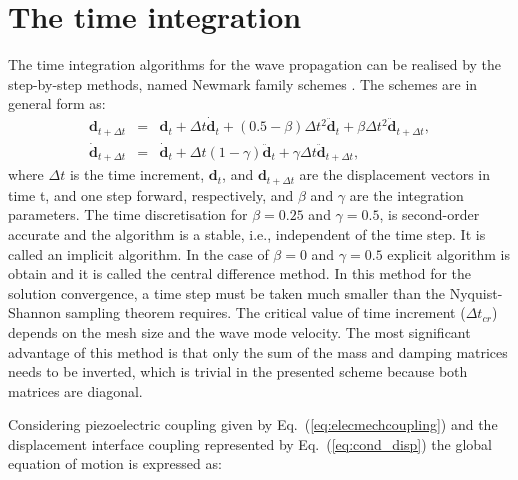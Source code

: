 \section{The time integration}
\label{sec:time}

The time integration algorithms for the wave propagation can be realised by the step-by-step methods, named Newmark family schemes \cite{newmark1959method}.
The schemes are in general form as:
\begin{eqnarray}
	\label{eq:u_newmark}
	\textbf{d}_{t+\Delta t} & = & \textbf{d}_{t} +\Delta t \dot{\textbf{d}}_{t} + \left( 0.5 - \beta \right)\Delta t^2\ddot{\textbf{d}}_{t} + \beta \Delta t^2\ddot{\textbf{d}}_{t+\Delta t},\\
	\dot{\textbf{d}}_{t+\Delta t} & = & \dot{\textbf{d}}_{t} + \Delta t\left(1-\gamma\right)\ddot{\textbf{d}}_{t} + \gamma \Delta t\ddot{\textbf{d}}_{t+\Delta t},
\end{eqnarray}
where \(\Delta t\) is the time increment, \(\textbf{d}_{t}\), and \(\textbf{d}_{t+\Delta t}\) are the displacement vectors in time t, and one step forward, respectively, and \(\beta\) and \(\gamma\) are the integration parameters.
The time discretisation for \(\beta = 0.25\) and \(\gamma = 0.5\), is second-order accurate and the algorithm is a stable, i.e., independent of the time step. It is called an implicit algorithm.
In the case of \(\beta = 0\) and \(\gamma = 0.5\) explicit algorithm is obtain and it is called the central difference method.
In this method for the solution convergence, a time step must be taken much smaller than the Nyquist-Shannon sampling theorem requires.
The critical value of time increment (\(\Delta t_{cr}\)) depends on the mesh size and the wave mode velocity.
The most significant advantage of this method is that only the sum of the mass and damping matrices needs to be inverted, which is trivial in the presented scheme because both matrices are diagonal.

Considering piezoelectric coupling given by Eq.~(\ref{eq:elecmechcoupling}) and the displacement interface coupling represented by Eq.~(\ref{eq:cond_disp}) the global equation of motion is expressed as:

